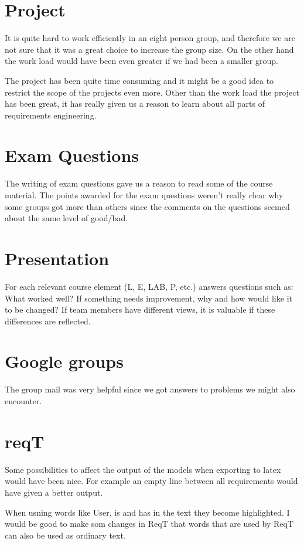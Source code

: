 \documentclass[a4paper]{article}
\begin{document}
	\section{Project}
	It is quite hard to work efficiently in an eight person group, and therefore we are not sure that it was a great choice to increase the group size. On the other hand the work load would have been even greater if we had been a smaller group.
	
	The project has been quite time consuming and it might be a good idea to restrict the scope of the projects even more. Other than the work load the project has been great, it has really given us a reason to learn about all parts of requirements engineering.

	\section{Exam Questions}
	The writing of exam questions gave us a reason to read some of the course material. The points awarded for the exam questions weren't really clear why some groups got more than others since the comments on the questions seemed about the same level of good/bad.	
	
	\section{Presentation}
	For each relevant course element (L, E, LAB, P, etc.) answers questions such as:
What worked well? If something needs improvement, why and how would like
it to be changed?
If team members have different views, it is valuable if these differences are
reflected.

	\section{Google groups}
	The group mail was very helpful since we got answers to problems we might also encounter.

	\section{reqT}
	Some possibilities to affect the output of the models when exporting to latex would have been nice. For example an empty line between all requirements would have given a better output.

	When usning words like User, is and has in the text they become highlighted. I would be good to make som changes in ReqT that words that are used by ReqT can also be used as ordinary text.
\end{document}
